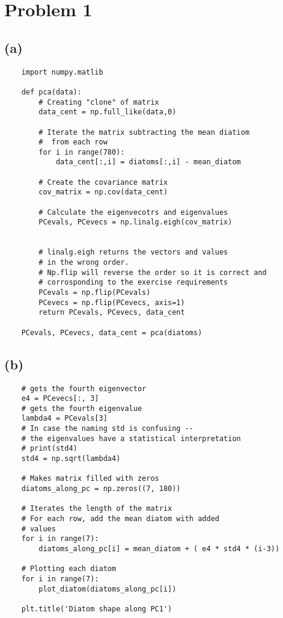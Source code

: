 \section{Problem 1}
\subsection{(a)}

\begin{verbatim}
    import numpy.matlib

    def pca(data):
        # Creating "clone" of matrix
        data_cent = np.full_like(data,0) 

        # Iterate the matrix subtracting the mean diatiom
        #  from each row
        for i in range(780):
            data_cent[:,i] = diatoms[:,i] - mean_diatom

        # Create the covariance matrix
        cov_matrix = np.cov(data_cent)

        # Calculate the eigenvecotrs and eigenvalues
        PCevals, PCevecs = np.linalg.eigh(cov_matrix)
        
        
        # linalg.eigh returns the vectors and values 
        # in the wrong order.
        # Np.flip will reverse the order so it is correct and
        # corrosponding to the exercise requirements
        PCevals = np.flip(PCevals)
        PCevecs = np.flip(PCevecs, axis=1)
        return PCevals, PCevecs, data_cent

    PCevals, PCevecs, data_cent = pca(diatoms)
\end{verbatim}

\subsection{(b)}

\begin{verbatim}
    # gets the fourth eigenvector
    e4 = PCevecs[:, 3] 
    # gets the fourth eigenvalue
    lambda4 = PCevals[3] 
    # In case the naming std is confusing -- 
    # the eigenvalues have a statistical interpretation
    # print(std4)
    std4 = np.sqrt(lambda4) 

    # Makes matrix filled with zeros
    diatoms_along_pc = np.zeros((7, 180))

    # Iterates the length of the matrix
    # For each row, add the mean diatom with added
    # values
    for i in range(7):
        diatoms_along_pc[i] = mean_diatom + ( e4 * std4 * (i-3))
        
    # Plotting each diatom
    for i in range(7):
        plot_diatom(diatoms_along_pc[i])

    plt.title('Diatom shape along PC1')
\end{verbatim}